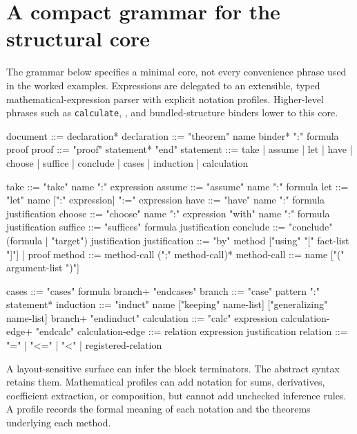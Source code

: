 \documentclass[11pt,a4paper]{article}
\newcommand{\codeid}[1]{\nolinkurl{#1}}
\begin{document}
\appendix
\section{A compact grammar for the structural core}
\label{app:grammar}

The grammar below specifies a minimal core, not every convenience phrase used in the worked examples. Expressions are delegated to an extensible, typed mathematical-expression parser with explicit notation profiles. Higher-level phrases such as \codeid{calculate}, \texttt{}, and bundled-structure binders lower to this core.

\par\noindent\begin{minipage}{\linewidth}
\begin{rawcode}
document    ::= declaration*
declaration ::= "theorem" name binder* ":" formula proof
proof       ::= "proof" statement* "end"
statement   ::= take | assume | let | have | choose
              | suffice | conclude | cases | induction | calculation

take        ::= "take" name ":" expression
assume      ::= "assume" name ":" formula
let         ::= "let" name [":" expression] ":=" expression
have        ::= "have" name ":" formula justification
choose      ::= "choose" name ":" expression
                "with" name ":" formula justification
suffice     ::= "suffices" formula justification
conclude    ::= "conclude" (formula | "target") justification
justification ::= "by" method ["using" "[" fact-list "]"]
                | proof
method      ::= method-call (";" method-call)*
method-call ::= name ["(" argument-list ")"]

cases       ::= "cases" formula branch+ "endcases"
branch      ::= "case" pattern ":" statement*
induction   ::= "induct" name
                ["keeping" name-list]
                ["generalizing" name-list]
                branch+ "endinduct"
calculation ::= "calc" expression calculation-edge+ "endcalc"
calculation-edge ::= relation expression justification
relation    ::= "=" | "<=" | "<" | registered-relation
\end{rawcode}
\end{minipage}\par

A layout-sensitive surface can infer the block terminators. The abstract syntax retains them. Mathematical profiles can add notation for sums, derivatives, coefficient extraction, or composition, but cannot add unchecked inference rules. A profile records the formal meaning of each notation and the theorems underlying each method.
\end{document}
